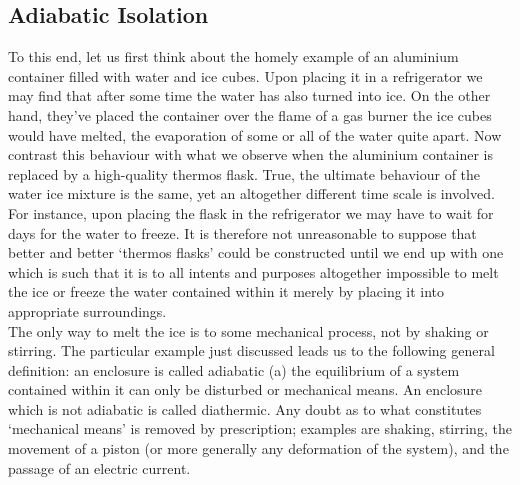 \documentclass{article}
\theoremstyle{definition}
\begin{document}
\subsection{Adiabatic Isolation}
To this end, let us first think about the homely example of an aluminium container filled with water and ice cubes. Upon placing it in a refrigerator we may find that after some time the water has also turned into ice. On the other hand, they've placed the container over the flame of a gas burner the ice cubes would have melted, the evaporation of some or all of the water quite apart. Now contrast this behaviour with what we observe when the aluminium container is replaced by a high-quality thermos flask. True, the ultimate behaviour of the water ice mixture is the same, yet an altogether different time scale is involved. For instance, upon placing the flask in the refrigerator we may have to wait for days for the water to freeze. It is therefore not unreasonable to suppose that better and better ‘thermos flasks’ could be constructed until we end up with one which is such that it is to all intents and purposes altogether impossible to melt the ice or freeze the water contained within it merely by placing it into appropriate surroundings.
\\
The only way to melt the ice is to some mechanical process, not by shaking or stirring.
\normalfont
The particular example just discussed leads us to the following general definition: an enclosure is called adiabatic (a) the equilibrium of a system contained within it can only be disturbed or mechanical means. An enclosure which is not adiabatic is called diathermic. Any doubt as to what constitutes ‘mechanical means’ is removed by prescription; examples are shaking, stirring, the movement of a piston (or more generally any deformation of the system), and the passage of an electric current.
\end{document}
